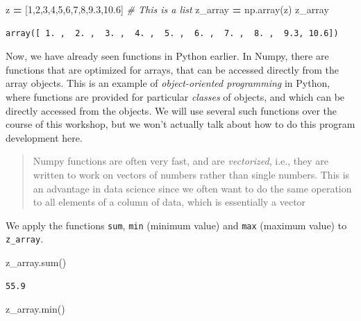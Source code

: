\documentclass[
  letterpaper,
]{scrbook}
\newenvironment{Shaded}{\begin{snugshade}}{\end{snugshade}}
\newcommand{\BuiltInTok}[1]{#1}
\newcommand{\CommentTok}[1]{\textcolor[rgb]{0.56,0.35,0.01}{\textit{#1}}}
\newcommand{\DecValTok}[1]{\textcolor[rgb]{0.00,0.00,0.81}{#1}}
\newcommand{\FloatTok}[1]{\textcolor[rgb]{0.00,0.00,0.81}{#1}}
\newcommand{\NormalTok}[1]{#1}
\newcommand{\OperatorTok}[1]{\textcolor[rgb]{0.81,0.36,0.00}{\textbf{#1}}}
\begin{document}
\begin{Shaded}
\begin{Highlighting}[]
\NormalTok{z }\OperatorTok{=}\NormalTok{ [}\DecValTok{1}\NormalTok{,}\DecValTok{2}\NormalTok{,}\DecValTok{3}\NormalTok{,}\DecValTok{4}\NormalTok{,}\DecValTok{5}\NormalTok{,}\DecValTok{6}\NormalTok{,}\DecValTok{7}\NormalTok{,}\DecValTok{8}\NormalTok{,}\FloatTok{9.3}\NormalTok{,}\FloatTok{10.6}\NormalTok{] }\CommentTok{# This is a list}
\NormalTok{z_array }\OperatorTok{=}\NormalTok{ np.array(z)}
\NormalTok{z_array}
\end{Highlighting}
\end{Shaded}

\begin{verbatim}
array([ 1. ,  2. ,  3. ,  4. ,  5. ,  6. ,  7. ,  8. ,  9.3, 10.6])
\end{verbatim}

Now, we have already seen functions in Python earlier. In Numpy, there are functions that are optimized for arrays, that can be accessed directly from the array objects. This is an example of \emph{object-oriented programming} in Python, where functions are provided for particular \emph{classes} of objects, and which can be directly accessed from the objects. We will use several such functions over the course of this workshop, but we won't actually talk about how to do this program development here.

\begin{quote}
Numpy functions are often very fast, and are \emph{vectorized}, i.e., they are written to work on vectors of numbers rather than single numbers. This is an advantage in data science since we often want to do the same operation to all elements of a column of data, which is essentially a vector
\end{quote}

We apply the functions \texttt{sum}, \texttt{min} (minimum value) and \texttt{max} (maximum value) to \texttt{z\_array}.

\begin{Shaded}
\begin{Highlighting}[]
\NormalTok{z_array.}\BuiltInTok{sum}\NormalTok{()}
\end{Highlighting}
\end{Shaded}

\begin{verbatim}
55.9
\end{verbatim}

\begin{Shaded}
\begin{Highlighting}[]
\NormalTok{z_array.}\BuiltInTok{min}\NormalTok{()}
\end{Highlighting}
\end{Shaded}
\end{document}
